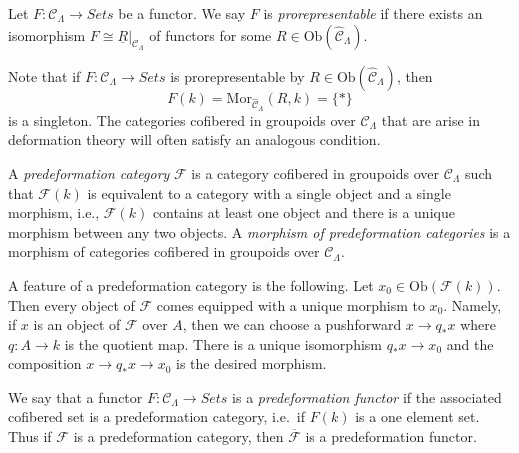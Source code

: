 \begin{definition}
\label{definition-prorepresentable}
Let $F : \mathcal{C}_\Lambda \to \textit{Sets}$ be a functor.
We say $F$ is {\it prorepresentable} if there exists an isomorphism
$F \cong \underline{R}|_{\mathcal{C}_\Lambda}$ of functors for some
$R \in \text{Ob}(\widehat{\mathcal{C}}_\Lambda)$.
\end{definition}  

\noindent
Note that if $F : \mathcal{C}_\Lambda \to \textit{Sets}$ is prorepresentable
by $R \in \text{Ob}(\widehat{\mathcal{C}}_\Lambda)$, then
$$
F(k) = \text{Mor}_{\widehat{\mathcal{C}}_\Lambda}(R, k) = \{*\}
$$
is a singleton. The categories cofibered in groupoids over
$\mathcal{C}_\Lambda$ that are arise in deformation theory will often satisfy
an analogous condition.

\begin{definition}
\label{definition-predeformation-category}
A {\it predeformation category} $\mathcal{F}$ is a category cofibered
in groupoids over $\mathcal{C}_\Lambda$ such that $\mathcal{F}(k)$ is
equivalent to a category with a single object and a single morphism,
i.e., $\mathcal{F}(k)$ contains at least one object and there is a
unique morphism between any two objects. A {\it morphism of predeformation
categories} is a morphism of categories cofibered in groupoids over
$\mathcal{C}_\Lambda$.
\end{definition}

\noindent
A feature of a predeformation category is the following.
Let $x_0 \in \text{Ob}(\mathcal{F}(k))$. Then every object of
$\mathcal{F}$ comes equipped with a unique morphism to $x_0$.
Namely, if $x$ is an object of $\mathcal{F}$ over $A$, then we
can choose a pushforward $x \to q_*x$ where $q : A \to k$ is the quotient
map. There is a unique isomorphism $q_*x \to x_0$ and the composition
$x \to q_*x \to x_0$ is the desired morphism.

\begin{remark}
\label{remark-predeformation-functor}
We say that a functor $F: \mathcal{C}_\Lambda \to \textit{Sets}$ 
is a {\it predeformation functor} if the associated cofibered set is a 
predeformation category, i.e.\ if $F(k)$ is a one element set.  Thus if 
$\mathcal{F}$ is a predeformation category, then $\overline{\mathcal{F}}$ is a 
predeformation functor.
\end{remark}

